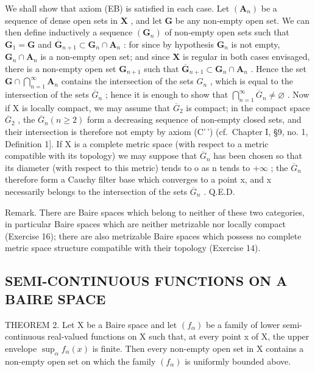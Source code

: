 We shall show that axiom (EB) is satisfied in each case. Let \((\mathbf{A}_n)\) be a sequence of dense open sets in \(\mathbf{X}\) , and let \(\mathbf{G}\) be any non-empty open set. We can then define inductively a sequence \((\mathbf{G}_n)\) of non-empty open sets such that \(\mathbf{G}_1 = \mathbf{G}\) and \(\overline{\mathbf{G}}_{n+1} \subset \mathbf{G}_n \cap \mathbf{A}_n\) : for since by hypothesis \(\mathbf{G}_n\) is not empty, \(\mathbf{G}_n \cap \mathbf{A}_n\) is a non-empty open set; and since \(\mathbf{X}\) is regular in both cases envisaged, there is a non-empty open set \(\mathbf{G}_{n+1}\) such that \(\overline{\mathbf{G}}_{n+1} \subset \mathbf{G}_n \cap \mathbf{A}_n\) . Hence the set \(\mathbf{G} \cap \bigcap_{n=1}^{\infty} \mathbf{A}_n\) contains the intersection of the sets \(G_{n}\) , which is equal to the intersection of the sets \(\overline{G}_{n}\) ; hence it is enough to show that \(\bigcap_{n=1}^{\infty}\overline{G}_{n}\neq\varnothing\) . Now if X is locally compact, we may assume that \(\overline{G}_{2}\) is compact; in the compact space \(\overline{G}_{2}\) , the \(\overline{G}_{n}(n\geqslant2)\) form a decreasing sequence of non-empty closed sets, and their intersection is therefore not empty by axiom (C'\,') (cf.~Chapter I, §9, no. 1, Definition 1{]}. If X is a complete metric space (with respect to a metric compatible with its topology) we may suppose that \(\overline{G}_{n}\) has been chosen so that its diameter (with respect to this metric) tends to o as n tends to \(+\infty\) ; the \(\overline{G}_{n}\) therefore form a Cauchy filter base which converges to a point x, and x necessarily belongs to the intersection of the sets \(\overline{G}_{n}\) . Q.E.D.

Remark. There are Baire spaces which belong to neither of these two categories, in particular Baire spaces which are neither metrizable nor locally compact (Exercise 16); there are also metrizable Baire spaces which possess no complete metric space structure compatible with their topology (Exercise 14).

\subsection{SEMI-CONTINUOUS FUNCTIONS ON A BAIRE SPACE}

THEOREM 2. Let X be a Baire space and let \((f_{\alpha})\) be a family of lower semi-continuous real-valued functions on X such that, at every point x of X, the upper envelope \(\sup_{\alpha} f_{\alpha}(x)\) is finite. Then every non-empty open set in X contains a non-empty open set on which the family \((f_{\alpha})\) is uniformly bounded above.

